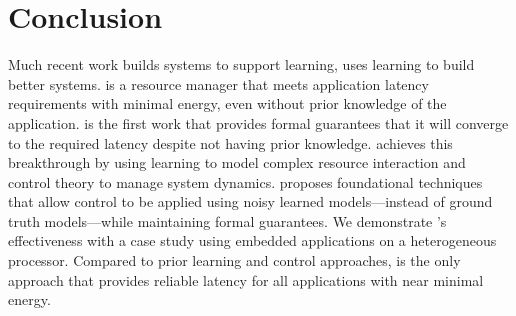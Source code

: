 \section{Conclusion}
Much recent work builds systems to support learning, \SYSTEM{} uses
learning to build better systems.  \SYSTEM{} is a resource manager
that meets application latency requirements with minimal energy, even
without prior knowledge of the application.  \SYSTEM{} is the first
work that provides formal guarantees that it will converge to the
required latency despite not having prior knowledge.  \SYSTEM{}
achieves this breakthrough by using learning to model complex resource
interaction and control theory to manage system dynamics.  \SYSTEM{}
proposes foundational techniques that allow control to be applied
using noisy learned models---instead of ground truth models---while
maintaining formal guarantees.  We demonstrate \SYSTEM{}'s
effectiveness with a case study using embedded applications on a
heterogeneous processor.  Compared to prior learning and control
approaches, \SYSTEM{} is the only approach that provides reliable
latency for all applications with near minimal energy.
